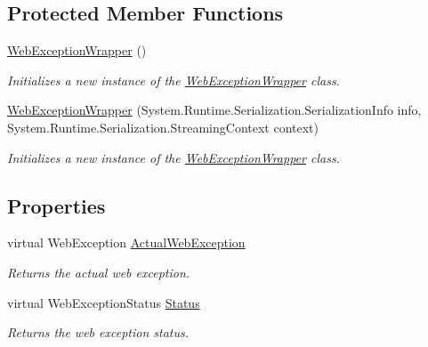 \subsection*{Protected Member Functions}
\begin{DoxyCompactItemize}
\item 
\hyperlink{class_accela_1_1_windows_store_s_d_k_1_1_web_exception_wrapper_ad890c2baae64f7ab0f6afdcf91b4b18d}{Web\+Exception\+Wrapper} ()
\begin{DoxyCompactList}\small\item\em Initializes a new instance of the \hyperlink{class_accela_1_1_windows_store_s_d_k_1_1_web_exception_wrapper}{Web\+Exception\+Wrapper} class. \end{DoxyCompactList}\item 
\hyperlink{class_accela_1_1_windows_store_s_d_k_1_1_web_exception_wrapper_a4f996de0cda52fa2b6b263bf0ef7ff75}{Web\+Exception\+Wrapper} (System.\+Runtime.\+Serialization.\+Serialization\+Info info, System.\+Runtime.\+Serialization.\+Streaming\+Context context)
\begin{DoxyCompactList}\small\item\em Initializes a new instance of the \hyperlink{class_accela_1_1_windows_store_s_d_k_1_1_web_exception_wrapper}{Web\+Exception\+Wrapper} class. \end{DoxyCompactList}\end{DoxyCompactItemize}
\subsection*{Properties}
\begin{DoxyCompactItemize}
\item 
virtual Web\+Exception \hyperlink{class_accela_1_1_windows_store_s_d_k_1_1_web_exception_wrapper_a05fba4bff9f5158041a5be026e5c1757}{Actual\+Web\+Exception}
\begin{DoxyCompactList}\small\item\em Returns the actual web exception. \end{DoxyCompactList}\item 
virtual Web\+Exception\+Status \hyperlink{class_accela_1_1_windows_store_s_d_k_1_1_web_exception_wrapper_a9d16702f6a5d92c66cd47a963965b618}{Status}
\begin{DoxyCompactList}\small\item\em Returns the web exception status. \end{DoxyCompactList}\end{DoxyCompactItemize}


